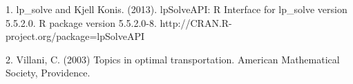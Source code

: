  1. lp\_solve and Kjell Konis. (2013). lpSolveAPI: R Interface for lp\_solve version 5.5.2.0. R package version 5.5.2.0-8. http://CRAN.R-project.org/package=lpSolveAPI 



2. Villani, C. (2003) Topics in optimal transportation. American Mathematical Society, Providence.

%

%
